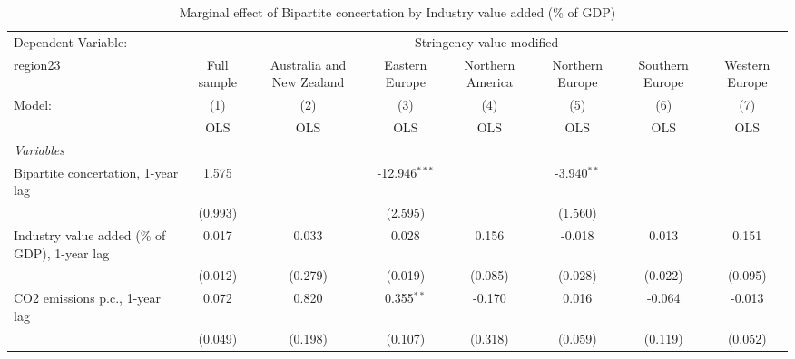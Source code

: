 
\begin{table}[htbp]
   \caption{Marginal effect of Bipartite concertation by Industry value added (\% of GDP)}
   \centering
   \begin{tabular}{lccccccc}
      \toprule
      Dependent Variable: & \multicolumn{7}{c}{Stringency value modified}\\
      region23                                                                           & Full sample   & Australia and New Zealand & Eastern Europe  & Northern America & Northern Europe & Southern Europe & Western Europe \\   
      Model:                                                                             & (1)           & (2)                       & (3)             & (4)              & (5)             & (6)             & (7)\\  
                                                                                         &  OLS          & OLS                       & OLS             & OLS              & OLS             & OLS             & OLS\\  
      \midrule
      \emph{Variables}\\
      Bipartite concertation, 1-year lag                                                 & 1.575         &                           & -12.946$^{***}$ &                  & -3.940$^{**}$   &                 &   \\   
                                                                                         & (0.993)       &                           & (2.595)         &                  & (1.560)         &                 &   \\   
      Industry value added (\% of GDP), 1-year lag                                       & 0.017         & 0.033                     & 0.028           & 0.156            & -0.018          & 0.013           & 0.151\\   
                                                                                         & (0.012)       & (0.279)                   & (0.019)         & (0.085)          & (0.028)         & (0.022)         & (0.095)\\   
      CO2 emissions p.c., 1-year lag                                                     & 0.072         & 0.820                     & 0.355$^{**}$    & -0.170           & 0.016           & -0.064          & -0.013\\   
                                                                                         & (0.049)       & (0.198)                   & (0.107)         & (0.318)          & (0.059)         & (0.119)         & (0.052)\\   

\end{tabular}
\end{table}
